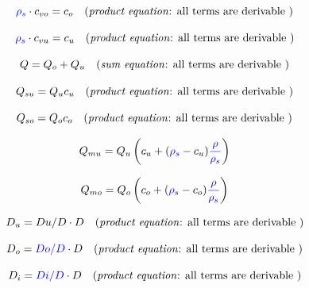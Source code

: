 \documentclass[12pt,reqno,intlimits,twoside]{amsart}
\begin{document}
\begin{equation}\label{EqCvoCo} %
   \textcolor{blue}{\rho_s} \cdot c_{vo} = c_o%
   \quad\text{(\emph{product equation}: all terms are derivable )}
\end{equation}

\begin{equation}\label{EqCvuCu} %
   \textcolor{blue}{\rho_s} \cdot c_{vu} = c_u%
   \quad\text{(\emph{product equation}: all terms are derivable )}
\end{equation}

\begin{equation}\label{EqQQoQu} %
   Q = Q_o + Q_u%
   \quad\text{(\emph{sum equation}: all terms are derivable )}
\end{equation}

\begin{equation}\label{EqQsuQuCu} %
   Q_{su} = Q_u c_u%
   \quad\text{(\emph{product equation}: all terms are derivable )}
\end{equation}

\begin{equation}\label{EqQsoQoCo} %
   Q_{so} = Q_o c_o%
   \quad\text{(\emph{product equation}: all terms are derivable )}
\end{equation}

\begin{equation}\label{EqQmuQuCu} %
   Q_{mu} = Q_u \left(c_u + (\textcolor{blue}{\rho_s} - c_u)\textcolor{blue}{\dfrac{\rho}{\rho_s}}\right)
\end{equation}

\begin{equation}\label{EqQmoQoCo} %
   Q_{mo} = Q_o \left(c_o + (\textcolor{blue}{\rho_s} - c_o)\textcolor{blue}{\dfrac{\rho}{\rho_s}}\right)
\end{equation}

\begin{equation}\label{EqDuD} %
   D_u = Du/D \cdot D%
   \quad\text{(\emph{product equation}: all terms are derivable )}
\end{equation}

\begin{equation}\label{EqDoD} %
   D_o = \textcolor{blue}{Do/D} \cdot D%
   \quad\text{(\emph{product equation}: all terms are derivable )}
\end{equation}

\begin{equation}\label{EqDiD} %
   D_i = \textcolor{blue}{Di/D} \cdot D%
   \quad\text{(\emph{product equation}: all terms are derivable )}
\end{equation}
\end{document}
